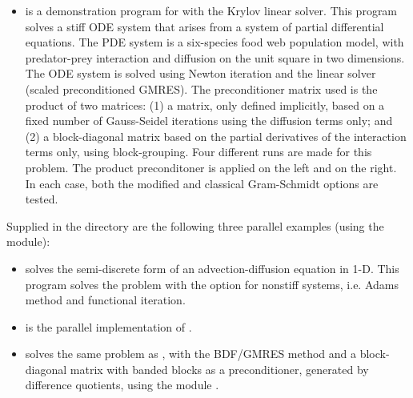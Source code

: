 \begin{itemize}
  (1) dense, user-supplied, (2) dense, difference-quotient approximation, 
  (3) diagonal approximation. The second problem is a linear ODE with a
  banded lower triangular matrix derived from a 2-D advection PDE. In this
  case, the Newton iteration cases use the following types of Jacobian
  approximation: (1) banded, user-supplied, (2) banded, difference-quotient
  approximation, (3) diagonal approximation.
\item {}
  is a demonstration program for {\cvode} with the Krylov linear solver.
  \newline
  This program solves a stiff ODE system that arises from a system     
  of partial differential equations.  The PDE system is a six-species
  food web population model, with predator-prey interaction and diffusion 
  on the unit square in two dimensions.
  \newline
  The ODE system is solved using Newton iteration and the      
  {\cvspgmr} linear solver (scaled preconditioned GMRES).
  \newline
  The preconditioner matrix used is the product of two matrices:         
  (1) a matrix, only defined implicitly, based on a fixed number of     
  Gauss-Seidel iterations using the diffusion terms only; and               
  (2) a block-diagonal matrix based on the partial derivatives of the   
  interaction terms only, using block-grouping.                          
  \newline
  Four different runs are made for this problem.                        
  The product preconditoner is applied on the left and on the right.    
  In each case, both the modified and classical Gram-Schmidt options    
  are tested.
\end{itemize}

Supplied in the  directory are
the following three parallel examples (using the {\nvecp} module):
\begin{itemize}
\item {}
  solves the semi-discrete form of an advection-diffusion equation in 1-D.
  \newline
  This program solves the problem with the option for nonstiff systems,
  i.e. Adams method and functional iteration.
\item {}
  is the parallel implementation of .
\item {}
  solves the same problem as , with the BDF/GMRES method 
  and a block-diagonal matrix with banded blocks as a preconditioner, 
  generated by difference quotients, using the module {\cvbbdpre}.
\end{itemize}


